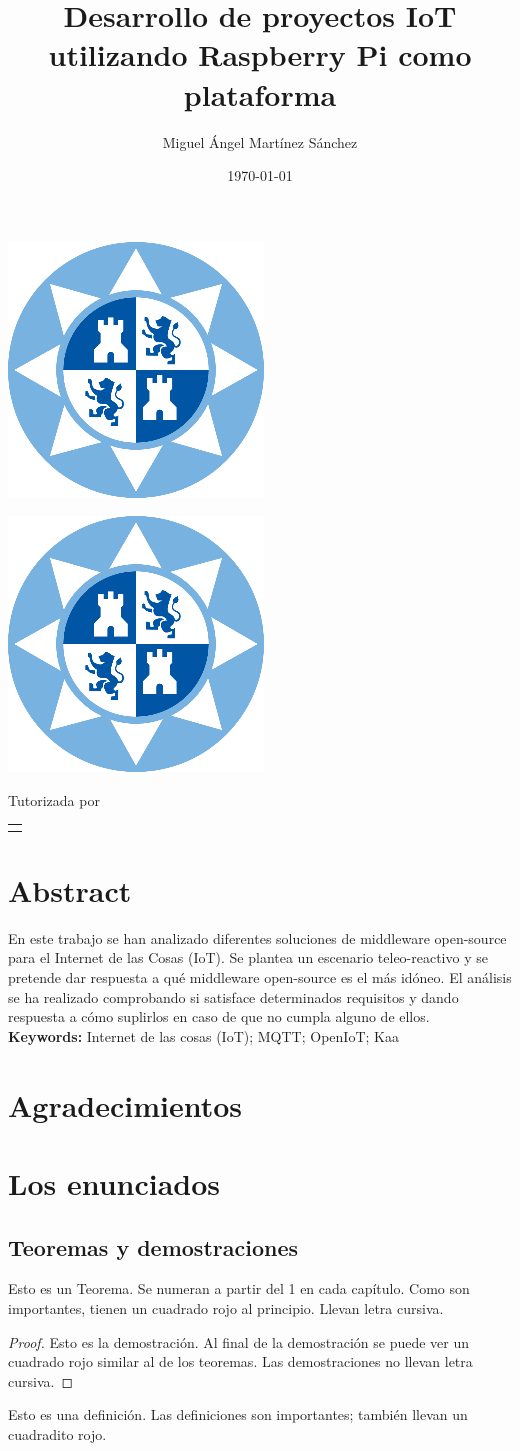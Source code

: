 \documentclass[12pt, twoside]{book}
\title{Desarrollo de proyectos IoT utilizando Raspberry Pi como plataforma}
\author{Miguel Ángel Martínez Sánchez}
\date{\today}
\makeatletter
\renewcommand\maketitle{%
  \begin{titlepage}
      \vspace*{1.5cm}
      \parskip=0pt
      \Huge\bfseries
      \begin{center}
          \leavevmode\includegraphics[totalheight=6cm]{sello.png}\\[2cm]
          \@title
      \end{center}
      \vspace{1cm}
      \begin{center}
          \@author
      \end{center}
  \end{titlepage}
  
  \begin{titlepage}
  \parindent=0pt
  \begin{flushleft}
  \vspace*{1.5mm}
  \setlength\baselineskip{0pt}
  \setlength\parskip{0mm}
  \begin{center}
      \leavevmode\includegraphics[totalheight=4.5cm]{sello.png}
  \end{center}
  \end{flushleft}
  \vspace{1cm}
  \bgroup
  \Large \bfseries
  \begin{center}
  \@title
  \end{center}
  \egroup
  \vspace*{.5cm}
  \begin{center}
  \@author
  \end{center}
  \vspace*{1.8cm}
  \begin{flushright}
  \begin{minipage}{8.45cm}

      \vspace*{7.5mm}

      Tutorizada por
  \end{minipage}\par
  \begin{tabularx}{8.45cm}[b]{@{}l}
      \guardatutores
  \end{tabularx}
   \end{flushright}
      \vspace*{\fill}
   \end{titlepage}
   \pagestyle{tfg}
   \renewcommand{\chaptermark}[1]{\markright{\thechapter.\space ##1}}
   \renewcommand{\sectionmark}[1]{}
   \renewcommand{\subsectionmark}[1]{}
  }
\makeatother
\begin{document}
 

\maketitle

\frontmatter
\tableofcontents

\mainmatter


\chapter*{Abstract}
En este trabajo se han analizado diferentes soluciones de middleware open-source para el Internet de las Cosas (IoT). Se plantea un escenario teleo-reactivo y se pretende dar respuesta a qué middleware open-source es el más idóneo. El análisis se ha realizado comprobando si satisface determinados requisitos y dando respuesta a cómo suplirlos en caso de que no cumpla alguno de ellos.\\

\textbf{Keywords:} Internet de las cosas (IoT); MQTT; OpenIoT; Kaa


\chapter*{Agradecimientos}
\chapter{Los enunciados}

\section{Teoremas y demostraciones}


\begin{theorem}[Euclides]\label{thm:th1}
    Esto es un Teorema. Se numeran a partir del 1 en cada capítulo. Como son importantes, tienen un cuadrado rojo al principio. Llevan letra cursiva.
\end{theorem}

\begin{proof}
    Esto es la demostración. Al final de la demostración se puede ver un cuadrado rojo similar al de los teoremas. Las demostraciones no llevan letra cursiva.
\end{proof}


\begin{definition}\label{def:1}
    Esto es una definición. Las definiciones son importantes; también llevan un cuadradito rojo.
\end{definition}
\end{document}
